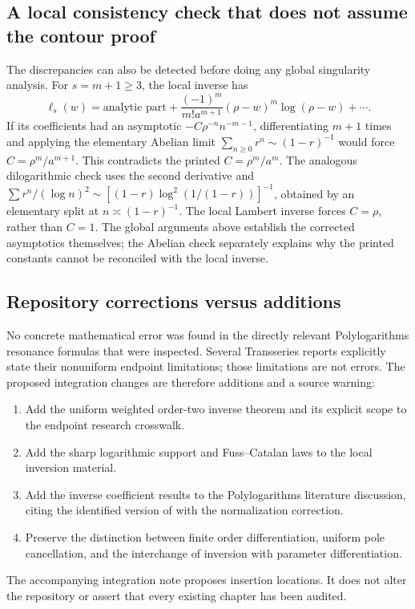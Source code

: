 \documentclass[11pt,a4paper]{article}
\numberwithin{equation}{section}
\theoremstyle{definition}
\theoremstyle{remark}
\newcommand{\LiInv}{\ell}
\begin{document}
\subsection{A local consistency check that does not assume the contour proof}

The discrepancies can also be detected before doing any global
singularity analysis.
For \(s=m+1\ge3\), the local inverse has
\[
 \LiInv_s(w)=\text{analytic part}
 +\frac{(-1)^m}{m!a^{m+1}}
       (\rho-w)^m\log(\rho-w)+\cdots.
\]
If its coefficients had an asymptotic
\(-C\rho^{-n}n^{-m-1}\), differentiating \(m+1\) times and applying
the elementary Abelian limit
\(\sum_{n\ge0}r^n\sim(1-r)^{-1}\)
would force
\(C=\rho^m/a^{m+1}\).
This contradicts the printed \(C=\rho^m/a^m\).
The analogous dilogarithmic check uses the second derivative and
\(\sum r^n/(\log n)^2\sim
[(1-r)\log^2(1/(1-r))]^{-1}\), obtained by an elementary
split at \(n\asymp(1-r)^{-1}\).
The local Lambert inverse forces \(C=\rho\), rather than \(C=1\).
The global arguments above establish the corrected asymptotics
themselves; the Abelian check separately explains why the printed
constants cannot be reconciled with the local inverse.

\subsection{Repository corrections versus additions}

No concrete mathematical error was found in the directly relevant
Polylogarithms resonance formulas that were inspected.
Several Transseries reports explicitly state their nonuniform endpoint
limitations; those limitations are not errors.
The proposed integration changes are therefore additions and a source
warning:
\begin{enumerate}
\item Add the uniform weighted order-two inverse theorem and its
explicit scope to the endpoint research crosswalk.
\item Add the sharp logarithmic support and Fuss--Catalan laws to the
local inversion material.
\item Add the inverse coefficient results to the Polylogarithms
literature discussion, citing the identified version of \cite{kr} with
the normalization correction.
\item Preserve the distinction between finite order differentiation,
uniform pole cancellation, and the interchange of inversion with
parameter differentiation.
\end{enumerate}
The accompanying integration note proposes insertion locations.
It does not alter the repository or assert that every existing chapter
has been audited.
\end{document}

